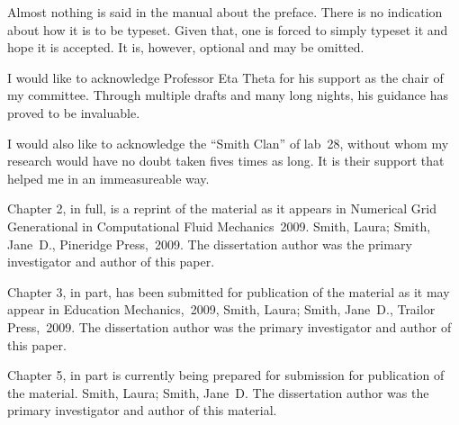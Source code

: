 \documentclass[12pt]{ucsddissertation}
\theoremstyle{plain}%
\theoremstyle{definition}
\begin{document}
\tableofcontents
\listoffigures
\listoftables

\begin{preface}
Almost nothing is said in the manual about the preface. There is no
indication about how it is to be typeset. Given that, one is forced to
simply typeset it and hope it is accepted. It is, however, optional
and may be omitted.
\end{preface}

\begin{acknowledgements}
I would like to acknowledge Professor Eta Theta for his support as the
chair of my committee. Through multiple drafts and many long nights,
his guidance has proved to be invaluable.

I would also like to acknowledge the ``Smith Clan'' of lab~28, without
whom my research would have no doubt taken fives times as long. It is
their support that helped me in an immeasureable way.

Chapter 2, in full, is a reprint of the material as it appears in
Numerical Grid Generational in Computational Fluid Mechanics~2009.
Smith, Laura; Smith, Jane~D., Pineridge Press,~2009. The dissertation
author was the primary investigator and author of this paper.

Chapter 3, in part, has been submitted for publication of the material
as it may appear in Education Mechanics,~2009, Smith, Laura; Smith,
Jane~D., Trailor Press,~2009. The dissertation author was the primary
investigator and author of this paper.

Chapter 5, in part is currently being prepared for submission for
publication of the material. Smith, Laura; Smith, Jane~D\@. The
dissertation author was the primary investigator and author of this
material.
\end{acknowledgements}
\end{document}
